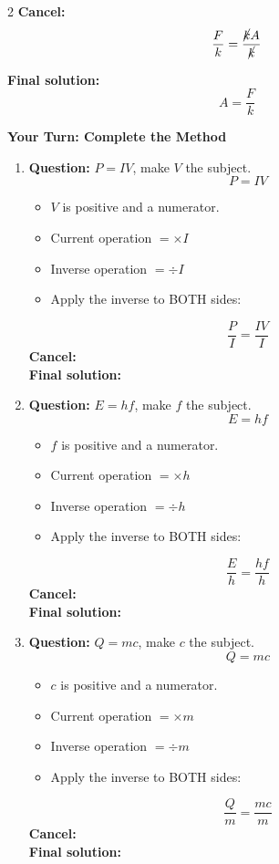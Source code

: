 \documentclass[11pt]{article}
\begin{document}
\begin{multicols}{2}
\textbf{Cancel:}
\[
\frac{F}{k}=\frac{\cancel{k}A}{\cancel{k}}
\]

\textbf{Final solution:}
\[
A=\frac{F}{k}
\]



\columnbreak
\textbf{Your Turn: Complete the Method}

\begin{enumerate}[leftmargin=*, itemsep=10pt]

\item \textbf{Question:} \( P = IV \), make \( V \) the subject.
\[
P=IV
\]
\begin{itemize}[leftmargin=*, itemsep=2pt]
\item \(V\) is positive and a numerator.
\item Current operation \(= \times I\)
\item Inverse operation \(= \div I\)
\item Apply the inverse to BOTH sides:
\end{itemize}
\[
\frac{P}{I}=\frac{IV}{I}
\]
\textbf{Cancel:} \\[1.5cm]
\textbf{Final solution:}\\[1.5cm]

\item \textbf{Question:} \( E = hf \), make \( f \) the subject.
\[
E=hf
\]
\begin{itemize}[leftmargin=*, itemsep=2pt]
\item \(f\) is positive and a numerator.
\item Current operation \(= \times h\)
\item Inverse operation \(= \div h\)
\item Apply the inverse to BOTH sides:
\end{itemize}
\[
\frac{E}{h}=\frac{hf}{h}
\]
\textbf{Cancel:} \\[1.5cm]
\textbf{Final solution:}\\[1.5cm]

\newpage
\item \textbf{Question:} \( Q = mc \), make \( c \) the subject.
\[
Q=mc
\]
\begin{itemize}[leftmargin=*, itemsep=2pt]
\item \(c\) is positive and a numerator.
\item Current operation \(= \times m\)
\item Inverse operation \(= \div m\)
\item Apply the inverse to BOTH sides:
\end{itemize}
\[
\frac{Q}{m}=\frac{mc}{m}
\]
\textbf{Cancel:} \\[1.5cm]
\textbf{Final solution:}\\[1.5cm]


\end{enumerate}
\end{multicols}
\end{document}
